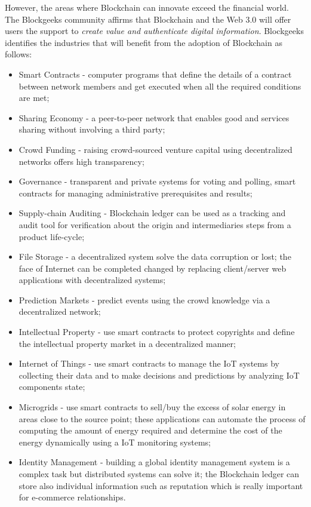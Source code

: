 However, the areas where Blockchain can innovate exceed the financial world. The Blockgeeks community \cite{blockgeeks} affirms that Blockchain and the Web 3.0 will offer users the support to \emph{create value and authenticate digital information}.
Blockgeeks identifies the industries that will benefit from the adoption of Blockchain as follows:
\begin{itemize}
	\item Smart Contracts - computer programs that define the details of a contract between network members and get executed when all the required conditions are met;
	\item Sharing Economy - a peer-to-peer network that enables good and services sharing without involving a third party;
	\item Crowd Funding - raising crowd-sourced venture capital using decentralized networks offers high transparency;
	\item Governance - transparent and private systems for voting and polling, smart contracts for managing administrative prerequisites and results;
	\item Supply-chain Auditing - Blockchain ledger can be used as a tracking and audit tool for verification about the origin and intermediaries steps from a product life-cycle;
	\item File Storage - a decentralized system solve the data corruption or lost; the face of Internet can be completed changed by replacing client/server web applications with decentralized systems;
	\item Prediction Markets - predict events using the crowd knowledge via a decentralized network;
	\item Intellectual Property - use smart contracts to protect copyrights and define the intellectual property market in a decentralized manner;
	\item Internet of Things - use smart contracts to manage the IoT systems by collecting their data and to make decisions and predictions by analyzing IoT components state;
	\item Microgrids - use smart contracts to sell/buy the excess of solar energy in areas close to the source point; these applications can automate the process of computing the amount of energy required and determine the cost of the energy dynamically using a IoT monitoring systems; 
	\item Identity Management - building a global identity management system is a complex task but distributed systems can solve it; the Blockchain ledger can store also individual information such as reputation which is really important for e-commerce relationships. 

\end{itemize}
